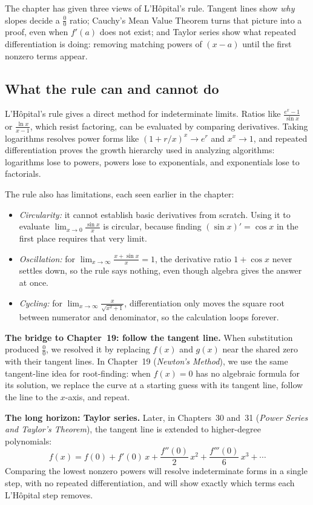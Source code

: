 \begin{aestheticbox}
The chapter has given three views of L'H\^opital's rule. Tangent lines show \emph{why} slopes decide a $\tfrac{0}{0}$ ratio; Cauchy's Mean Value Theorem turns that picture into a proof, even when $f'(a)$ does not exist; and Taylor series show what repeated differentiation is doing: removing matching powers of $(x-a)$ until the first nonzero terms appear.
\end{aestheticbox}

\subsection{What the rule can and cannot do}
\label{ch18:what-unlocked}

\begin{connectionbox}
L'H\^opital's rule gives a direct method for indeterminate
limits. Ratios like $\frac{e^x-1}{\sin x}$ or $\frac{\ln x}{x-1}$, which
resist factoring, can be evaluated by comparing derivatives.
Taking logarithms resolves power forms like $(1 + r/x)^x \to e^r$ and $x^x \to 1$, and
repeated differentiation proves the growth hierarchy used in
analyzing algorithms: logarithms lose to powers, powers lose to exponentials, and exponentials
lose to factorials.

The rule also has limitations, each seen earlier in the chapter:
\begin{itemize}
  \item \emph{Circularity:} it cannot establish basic derivatives from
  scratch. Using it to evaluate $\lim_{x\to 0}\frac{\sin x}{x}$ is circular,
  because finding $(\sin x)' = \cos x$ in the first place requires that very limit.
  \item \emph{Oscillation:} for $\lim_{x\to\infty}\frac{x + \sin x}{x} = 1$,
  the derivative ratio $1 + \cos x$ never settles down, so the rule says nothing,
  even though algebra gives the answer at once.
  \item \emph{Cycling:} for
  $\lim_{x\to\infty}\frac{x}{\sqrt{x^2+1}}$, differentiation only moves the square root
  between numerator and denominator, so the calculation loops forever.
\end{itemize}

\textbf{The bridge to Chapter~19: follow the tangent line.}
When substitution produced $\tfrac{0}{0}$, we resolved it
by replacing $f(x)$ and $g(x)$ near the shared zero with their tangent lines.
In Chapter~19 (\emph{Newton's Method}), we use the same tangent-line idea for
root-finding: when $f(x)=0$ has no algebraic formula for its solution, we replace the
curve at a starting guess with its tangent line, follow the line to the $x$-axis, and
repeat.

\textbf{The long horizon: Taylor series.}
Later, in Chapters~30 and~31 (\emph{Power Series and Taylor's Theorem}),
the tangent line is extended to higher-degree polynomials:
\[
  f(x) = f(0) + f'(0)\,x + \frac{f''(0)}{2}\,x^2 + \frac{f'''(0)}{6}\,x^3 + \cdots
\]
Comparing the lowest nonzero powers will resolve indeterminate forms in a single
step, with no repeated differentiation, and will show exactly which terms each
L'H\^opital step removes.
\end{connectionbox}

